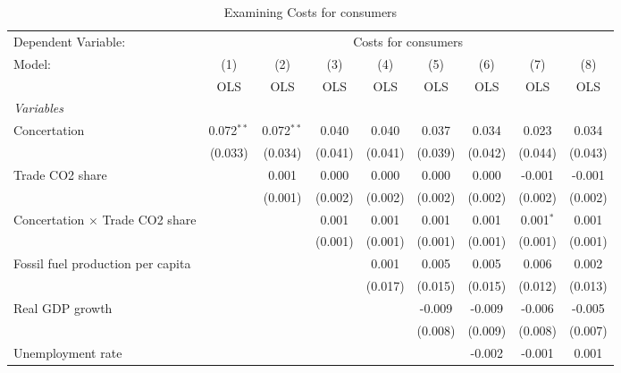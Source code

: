 
\begin{table}[htbp]
   \caption{Examining Costs for consumers}
   \centering
   \begin{tabular}{lcccccccc}
      \toprule
      Dependent Variable: & \multicolumn{8}{c}{Costs for consumers}\\
      Model:                                  & (1)          & (2)          & (3)     & (4)     & (5)     & (6)     & (7)         & (8)\\  
                                              &  OLS         & OLS          & OLS     & OLS     & OLS     & OLS     & OLS         & OLS\\  
      \midrule
      \emph{Variables}\\
      Concertation                            & 0.072$^{**}$ & 0.072$^{**}$ & 0.040   & 0.040   & 0.037   & 0.034   & 0.023       & 0.034\\   
                                              & (0.033)      & (0.034)      & (0.041) & (0.041) & (0.039) & (0.042) & (0.044)     & (0.043)\\   
      Trade CO2 share                         &              & 0.001        & 0.000   & 0.000   & 0.000   & 0.000   & -0.001      & -0.001\\   
                                              &              & (0.001)      & (0.002) & (0.002) & (0.002) & (0.002) & (0.002)     & (0.002)\\   
      Concertation $\times$ Trade CO2 share   &              &              & 0.001   & 0.001   & 0.001   & 0.001   & 0.001$^{*}$ & 0.001\\   
                                              &              &              & (0.001) & (0.001) & (0.001) & (0.001) & (0.001)     & (0.001)\\   
      Fossil fuel production per capita       &              &              &         & 0.001   & 0.005   & 0.005   & 0.006       & 0.002\\   
                                              &              &              &         & (0.017) & (0.015) & (0.015) & (0.012)     & (0.013)\\   
      Real GDP growth                         &              &              &         &         & -0.009  & -0.009  & -0.006      & -0.005\\   
                                              &              &              &         &         & (0.008) & (0.009) & (0.008)     & (0.007)\\   
      Unemployment rate                       &              &              &         &         &         & -0.002  & -0.001      & 0.001\\   

\end{tabular}
\end{table}
